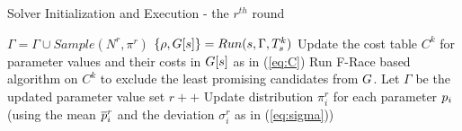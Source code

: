 \begin{algorithm}
\caption{Solver Initialization and Execution - the $r^{th} $ round \label{algoFals}}
\begin{algorithmic}
  \State {}
  \State $\Gamma  = \Gamma  \cup  Sample(N^{r}, \pi^r)$
   \State
  \ForAll{$\solver \in \solverset$} 
     \State {}    
      \State $\{ \rho, G[s] \} = Run(s, \Gamma, T_{s}^k)$    
      \State  Update the cost table $C^k$ for parameter values and their costs in $G[s]$ as in (\ref{eq:C})
     \EndFor
   \State
   \State Run F-Race based algorithm on $C^k$ to exclude the least promising candidates from $G$. 
   \State Let $\Gamma$ be the updated parameter value set 
   \State
  \State $r++$  %
  \State Update distribution $\pi_i^r$ for each parameter $p_i$ (using the mean $\overline{p}^r_i$ and the deviation $\sigma^r_i$ as in (\ref{eq:sigma}))
\end{algorithmic}
\end{algorithm}



